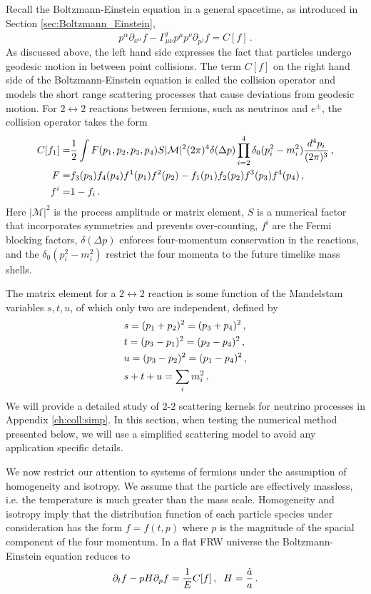 Recall the  Boltzmann-Einstein equation in a general spacetime, as introduced in Section \ref{sec:Boltzmann_Einstein},
\begin{equation}
p^\alpha\partial_{x^\alpha}f-\Gamma^j_{\mu\nu}p^\mu p^\nu\partial_{p^j}f=C[f]\,.
\end{equation}
As discussed above, the left hand side expresses the fact that particles undergo geodesic motion in between point collisions. The term $C[f]$ on the right hand side of the Boltzmann-Einstein equation is called the collision operator and models the short range scattering processes that cause deviations from geodesic motion. For $2\leftrightarrow 2$ reactions between fermions, such as neutrinos and $e^\pm$, the collision operator takes the form
\begin{align}\label{coll}
C[f_1]=&\frac{1}{2}\int F(p_1,p_2,p_3,p_4) S |\mathcal{M}|^2(2\pi)^4\delta(\Delta p)\prod_{i=2}^4\delta_0(p_i^2-m_i^2)\frac{d^4p_i}{(2\pi)^3}\,,\\
F=&f_3(p_3)f_4(p_4)f^1(p_1)f^2(p_2)-f_1(p_1)f_2(p_2)f^3(p_3)f^4(p_4)\,,\notag\\
f^i=&1- f_i\,.\notag
\end{align}
Here $|\mathcal{M}|^2$ is the process amplitude or matrix element, $S$ is a numerical factor that incorporates symmetries and prevents over-counting, $f^i$ are the Fermi blocking factors, $\delta(\Delta p)$ enforces four-momentum conservation in the reactions, and the $\delta_0(p_i^2-m_i^2)$ restrict the four momenta to the future timelike mass shells.


The matrix element for a $2\leftrightarrow2$ reaction is some function of the Mandelstam variables $s, t, u$, of which only two are independent, defined by
\begin{align}\label{Mandelstam}
&s=(p_1+p_2)^2=(p_3+p_4)^2\,,\\
&t=(p_3-p_1)^2=(p_2-p_4)^2\,,\notag\\
&u=(p_3-p_2)^2=(p_1-p_4)^2\,,\notag\\
&s+t+u=\sum_i m_i^2\,.\notag
\end{align}
We will provide a detailed study of $2$-$2$ scattering kernels for neutrino processes in Appendix \ref{ch:coll:simp}.  In this section, when testing the numerical method presented below, we will use a simplified scattering model to avoid any application specific details.

We now restrict our attention to  systems of fermions under the assumption of homogeneity and isotropy. We assume that the particle are effectively massless,  i.e. the temperature is much greater than the mass scale.  Homogeneity and isotropy imply that the distribution function of each particle species under consideration has the form $f=f(t,p)$ where $p$ is the magnitude of the spacial component of the four momentum.  In a flat FRW universe the Boltzmann-Einstein equation reduces to
\begin{equation}\label{boltzmann_p}
\partial_t f-pH \partial_p f=\frac{1}{E}C[f]\,,\hspace{2mm} H=\frac{\dot{a}}{a}\,.
\end{equation}

